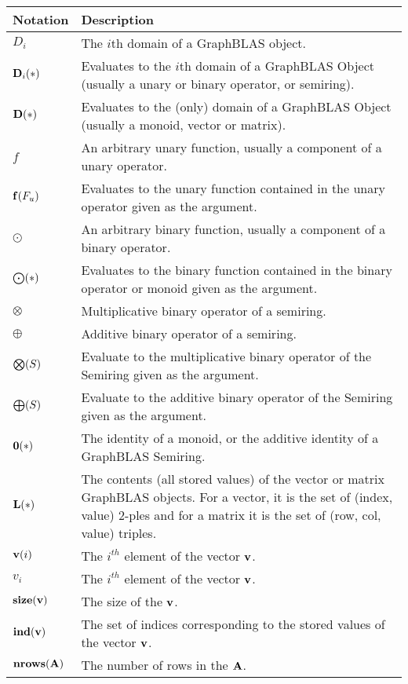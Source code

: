 \begin{tabular}[H]{l|p{5in}}
Notation & Description \\
\hline
$D_i$           & The $i$th domain of a GraphBLAS object. \\
$\bold{D}_i(*)$ & Evaluates to the $i$th domain of a GraphBLAS Object (usually a unary or binary operator, or semiring). \\
$\bold{D}(*)$   & Evaluates to the (only) domain of a GraphBLAS Object (usually a monoid, vector or matrix). \\ 
$f$             & An arbitrary unary function, usually a component of a unary operator. \\
$\bold{f}(F_u)$ & Evaluates to the unary function contained in the unary operator given as the argument. \\
$\odot$         & An arbitrary binary function, usually a component of a binary operator. \\
$\bold{\bigodot}(*)$ & Evaluates to the binary function contained in the binary operator or monoid given as the argument. \\
$\otimes$       & Multiplicative binary operator of a semiring. \\
$\oplus$        & Additive binary operator of a semiring. \\
$\bold{\bigotimes}(S)$ & Evaluate to the multiplicative binary operator of the Semiring given as the argument. \\
$\bold{\bigoplus}(S)$ & Evaluate to the additive binary operator of the Semiring given as the argument. \\
$\bold{0}(*)$   & The identity of a monoid, or the additive identity of a GraphBLAS Semiring. \\
$\bold{L}(*)$   & The contents (all stored values) of the vector or matrix GraphBLAS objects.  For a vector, it is the set of (index, value) 2-ples and for a matrix it is the set of (row, col, value) triples. \\
$\bold{v}(i)$   & The $i^{th}$ element of the vector ${\bf v}$.\\
$v_i$           & The $i^{th}$ element of the vector ${\bf v}$.\\
$\bold{size}({\bf v})$ & The size of the ${\bf v}$.\\
$\bold{ind}({\bf v})$ & The set of indices corresponding to the stored values of the vector ${\bf v}$.\\
$\bold{nrows}({\bf A})$ & The number of rows in the ${\bf A}$.\\

\end{tabular}
